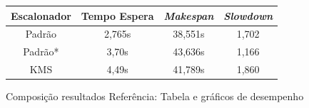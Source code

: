  \begin{figure}[!ht]
	\centering
	\begin{tabular}[b]{cccc}\hline
		Escalonador & Tempo Espera & \textit{Makespan} & \textit{Slowdown}\\ \hline
		Padrão  & 2,765s & 38,551s & 1,702\\
		Padrão* & 3,70s  & 43,636s & 1,166 \\
		KMS     & 4,49s & 41,789s & 1,860 \\ \hline
	\end{tabular}
	\qquad
	\qquad
	\qquad
	\caption{Composição resultados Referência: Tabela e gráficos de desempenho}
	\label{fig:cenario-base}
\end{figure}

